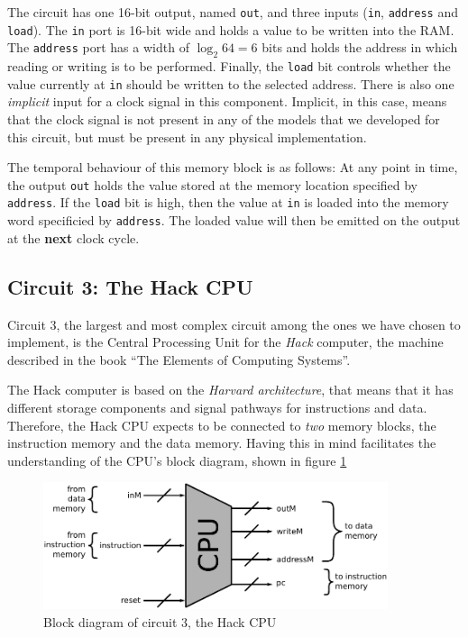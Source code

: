 \documentclass[a4paper]{article}
\begin{document}
            The circuit has one 16-bit output, named \texttt{out}, and three inputs (\texttt{in},
            \texttt{address} and \texttt{load}). The \texttt{in} port is 16-bit wide and holds a
            value to be written into the RAM. The \texttt{address} port has a width of $\log_{2} 64
            = 6$ bits and holds the address in which reading or writing is to be performed. Finally,
            the \texttt{load} bit controls whether the value currently at \texttt{in} should be
            written to the selected address. There is also one \emph{implicit} input for a clock
            signal in this component.  Implicit, in this case, means that the clock signal is not
            present in any of the models that we developed for this circuit, but must be present in
            any physical implementation.

            The temporal behaviour of this memory block is as follows: At any point in time, the
            output \texttt{out} holds the value stored at the memory location specified by
            \texttt{address}.  If the \texttt{load} bit is high, then the value at \texttt{in} is
            loaded into the memory word specificied by \texttt{address}. The loaded value will then
            be emitted on the output at the \textbf{next} clock cycle.

        \subsection{Circuit 3: The Hack CPU}
        \label{subsec:hack-cpu-circuit}
            Circuit 3, the largest and most complex circuit among the ones we have chosen to
            implement, is the Central Processing Unit for the \emph{Hack} computer, the machine
            described in the book ``The Elements of Computing Systems''\cite{nand2tetris-book}.

            The Hack computer is based on the \emph{Harvard architecture}, that means that it has
            different storage components and signal pathways for instructions and data. Therefore,
            the Hack CPU expects to be connected to \emph{two} memory blocks, the instruction memory
            and the data memory. Having this in mind facilitates the understanding of the CPU's
            block diagram, shown in figure \ref{fig:cpu-block}

            \begin{figure}[h!]
                \begin{center}
                    \includegraphics[width=0.9\textwidth]{imgs/cpu-block.pdf}
                \end{center}
                \caption{Block diagram of circuit 3, the Hack CPU
                    \label{fig:cpu-block}}
            \end{figure}
\end{document}
